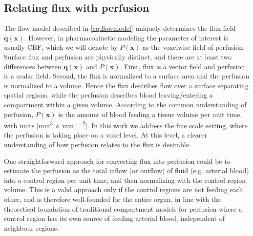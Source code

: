 \documentclass[final,5p,times,twocolumn]{elsarticle}
\begin{document}

	\subsection{Relating flux with perfusion}\label{sec:flux2perf}
	The flow model described in \eqref{eq:flowmodel} uniquely determines the flux field $\mathbf{q}(\mathbf{x})$. 
	However, in pharmacokinetic modeling the parameter of interest is usually CBF, which we will denote by $P (\mathbf{x})$ as the voxelwise field of perfusion. Surface flux and perfusion are physically distinct, and there are at least two differences between $\mathbf{q}(\mathbf{x})$ and $P (\mathbf{x})$. 
	First, flux is a vector field and perfusion is a scalar field. Second, the flux is normalized to a surface area and the perfusion is normalized to a volume. 
	Hence the flux describes flow over a surface separating spatial regions, while the perfusion describes blood leaving/entering a compartment within a given volume. 	
According to the common understanding of perfusion,
	 $P (\mathbf{x})$ is the amount of blood feeding a tissue volume per unit time, with units [\si{\milli\meter\cubed\per\second\per\milli\meter\squared}]. 
	 In this work we address the  fine scale setting, where the perfusion is taking place on a voxel level. At this level, a clearer understanding of how perfusion relates to the flux is desirable.  

	One straightforward approach for converting flux into perfusion could be to estimate the perfusion as the total inflow (or outflow) of fluid (e.g. arterial blood) into a control region per unit time, and then normalizing with the control region volume. 
	This is a valid approach only if the control regions are not feeding each other, and is therefore well-founded for the entire organ,
	in line with the theoretical foundation of traditional compartment models for perfusion where a control region has its own source of feeding arterial blood, independent of neighbour regions. 
\end{document}

